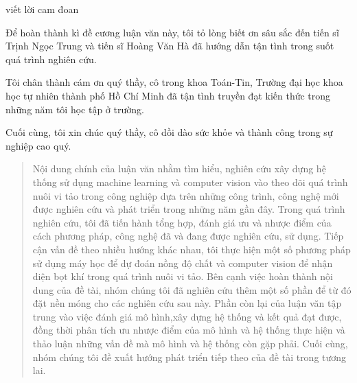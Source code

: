 \documentclass[12pt,a4paper,oneside]{book} %
\begin{document}

\coverpage

\frontmatter


\begin{declaration}
	viết lời cam đoan
\end{declaration}

\begin{acknowledgments}

	Để hoàn thành kì đề cương luận văn này, tôi tỏ lòng biết ơn sâu sắc đến tiến sĩ Trịnh Ngọc Trung và tiến sĩ Hoàng Văn Hà đã hướng dẫn tận tình trong suốt quá trình nghiên cứu.
	
	Tôi chân thành cám ơn quý thầy, cô trong khoa Toán-Tin, Trường đại học khoa học tự nhiên thành phố Hồ Chí Minh đã tận tình truyền đạt kiến thức trong những năm tôi học tập ở trường.

	Cuối cùng, tôi xin chúc quý thầy, cô dồi dào sức khỏe và thành công trong sự nghiệp cao quý.
	
\end{acknowledgments}
	
\begin{abstract}
	Nội dung chính của luận văn nhằm tìm hiểu, nghiên cứu xây dựng hệ thống sử dụng machine learning và computer vision vào theo dõi quá trình nuôi vi tảo trong công nghiệp dựa trên những công trình, công nghệ mới được nghiên cứu và phát
triển trong những năm gần đây. Trong quá trình nghiên cứu, tôi đã
tiến hành tổng hợp, đánh giá ưu và nhược điểm của cách phương pháp, công nghệ đã và đang
được nghiên cứu, sử dụng. Tiếp cận vấn đề theo nhiều hướng khác nhau, tôi thực hiện một số
phương pháp sử dụng máy học để dự đoán nồng độ chất và computer vision để nhận diện bọt khí trong quá trình nuôi vi tảo. Bên
cạnh việc hoàn thành nội dung của đề tài, nhóm chúng tôi đã nghiên cứu thêm một số phần để
từ đó đặt nền móng cho các nghiên cứu sau này. Phần còn lại của luận văn tập trung vào việc
đánh giá mô hình,xây dựng hệ thống và kết quả đạt được, đồng thời phân tích ưu nhược điểm của mô hình và hệ thống thực hiện
và thảo luận những vấn đề mà mô hình và hệ thống còn gặp phải. Cuối cùng, nhóm chúng tôi đề xuất hướng
phát triển tiếp theo của đề tài trong tương lai.
\end{abstract}	
\end{document}
